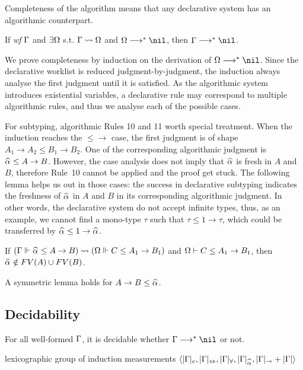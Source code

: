 Completeness of the algorithm means that any declarative system has an algorithmic counterpart.

\begin{theorem}[Completeness]
If \emph{wf }$\Gamma$ and $\exists \Omega$ s.t. $\Gamma\rightsquigarrow\Omega$ and $\Om\redto\nil$, then $\Gm \redto \nil$.
\end{theorem}

We prove completeness by induction on the derivation of $\Om\redto\nil$.
Since the declarative worklist is reduced judgment-by-judgment,
the induction always analyse the first judgment until it is satisfied.
As the algorithmic system introduces existential variables,
a declarative rule may correspond to multiple algorithmic rules,
and thus we analyse each of the possible cases.

For subtyping, algorithmic Rules 10 and 11 worth special treatment.
When the induction reaches the $\mathtt{{\le}{\to}}$ case,
the first judgment is of shape $A_1 \to A_2 \le B_1 \to B_2$.
One of the corresponding algorithmic judgment is $\al \le A \to B$.
However, the case analysis does not imply that $\al$ is fresh in $A$ and $B$,
therefore Rule~10 cannot be applied and the proof get stuck.
The following lemma helps us out in those cases:
the success in declarative subtyping indicates the freshness of $\al$ in $A$ and $B$
in its corresponding algorithmic judgment.
In other words, the declarative system do not accept infinite types,
thus, as an example, we cannot find a mono-type $\tau$ such that $\tau\le 1\to \tau$,
which could be transferred by $\al\le 1\to\al$.

\begin{lemma}
If $(\Gm \Vdash \al \le A \to B) \sto (\Om \Vdash C \le A_1 \to B_1)$ and
$\Omega \vdash C \le A_1 \to B_1$, then $\al\notin FV(A) \cup FV(B)$.
\end{lemma}

A symmetric lemma holds for $A\to B \le \al$.

\subsection{Decidability}
\begin{theorem}[Decidability]
For all well-formed $\Gamma$, it is decidable whether $\Gm\redto\nil$ or not.
\end{theorem}

lexicographic group of induction measurements
$\langle |\Gm|_e, |\Gm|_\Leftrightarrow, |\Gm|_\forall, |\Gm|_{\al}, |\Gm|_\to + |\Gm| \rangle$


